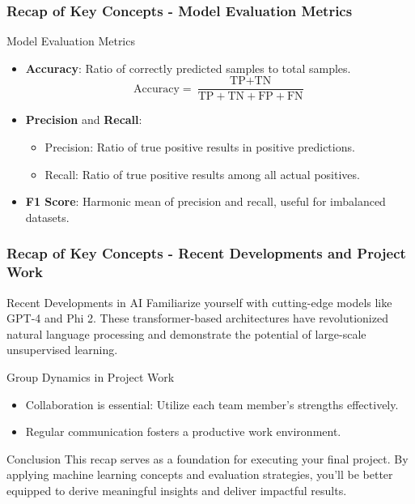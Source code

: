 \documentclass[aspectratio=169]{beamer}
\begin{document}
\begin{frame}[fragile]
    \frametitle{Recap of Key Concepts - Model Evaluation Metrics}
    \begin{block}{Model Evaluation Metrics}
        \begin{itemize}
            \item \textbf{Accuracy}: Ratio of correctly predicted samples to total samples.
                \begin{equation}
                \text{Accuracy} = \frac{\text{TP} + \text{TN}}{\text{TP} + \text{TN} + \text{FP} + \text{FN}}
                \end{equation}
            \item \textbf{Precision} and \textbf{Recall}:
                \begin{itemize}
                    \item Precision: Ratio of true positive results in positive predictions.
                    \item Recall: Ratio of true positive results among all actual positives.
                \end{itemize}
            \item \textbf{F1 Score}: Harmonic mean of precision and recall, useful for imbalanced datasets.
        \end{itemize}
    \end{block}
\end{frame}

\begin{frame}[fragile]
    \frametitle{Recap of Key Concepts - Recent Developments and Project Work}
    \begin{block}{Recent Developments in AI}
        Familiarize yourself with cutting-edge models like GPT-4 and Phi 2. 
        These transformer-based architectures have revolutionized natural language processing and demonstrate the potential of large-scale unsupervised learning.
    \end{block}

    \begin{block}{Group Dynamics in Project Work}
        \begin{itemize}
            \item Collaboration is essential: Utilize each team member's strengths effectively.
            \item Regular communication fosters a productive work environment.
        \end{itemize}
    \end{block}
    
    \begin{block}{Conclusion}
        This recap serves as a foundation for executing your final project.
        By applying machine learning concepts and evaluation strategies, you'll be better equipped to derive meaningful insights and deliver impactful results.
    \end{block}
\end{frame}
\end{document}
